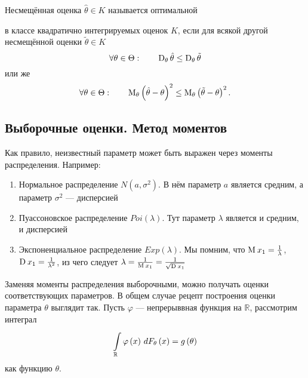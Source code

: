 \begin{definition}
  Несмещённая оценка $\hat{\theta}\in K$ называется оптимальной
  \begin{comment}
  \footnote{В учебнике Боровкова А. А.
  ``Математическая статистика'' оценка, удовлетворяющая этим условиям,
  носит название \textbf{эффективная оценка} \cite[стр.~130]{BorovkovMS},
  но у нас этот термин будет использоваться далее в другом смысле}
  \end{comment}
  в классе квадратично интегрируемых оценок $K$,
  если для всякой другой несмещённой оценки $\tilde{\theta}\in K$
  \begin{equation*}
    \forall\theta\in\Theta:\qquad
    \dispersionof{\theta}{\hat{\theta}} \le \dispersionof{\theta}{\tilde{\theta}}
  \end{equation*}
  или же
  \begin{equation*}
    \forall\theta\in\Theta:\qquad
    \meanof{\theta}{\left(\hat{\theta} - \theta\right)^2}
    \le \meanof{\theta}{\left( \tilde{\theta} - \theta \right)^2}.
  \end{equation*}
\end{definition}

\subsection{Выборочные оценки. Метод моментов}
Как правило, неизвестный параметр может быть выражен через моменты
распределения. Например:

\begin{enumerate}
  \item Нормальное распределение $N\left(a,\sigma^2\right)$.
    В нём параметр $a$ является средним,
    а параметр $\sigma^2$ --- дисперсией
  \item Пуассоновское распределение $Poi\left(\lambda\right)$.
    Тут параметр $\lambda$ является и средним, и дисперсией
  \item Экспоненциальное распределение $Exp\left(\lambda\right)$.
    Мы помним, что $\mean{x_1} = \frac{1}{\lambda}$,
    $\dispersion{x_1} = \frac{1}{\lambda^2}$, из чего следует 
    $\lambda = \frac{1}{\mean{x_1}} = \frac{1}{\sqrt{\dispersion{x_1}}}$
\end{enumerate}

Заменяя моменты распределения выборочными, можно получать оценки
соответствующих параметров.
В общем случае рецепт построения оценки параметра $\theta$ выглядит так.
Пусть $\varphi$ --- непрерыввная функция на $\mathbb{R}$, рассмотрим интеграл
\begin{equation*}
  \integrall{\mathbb{R}}{d\cdfof{\theta}{x}}{\varphi\left( x \right)}
  = g\left( \theta \right)
\end{equation*}
как функцию $\theta$.

